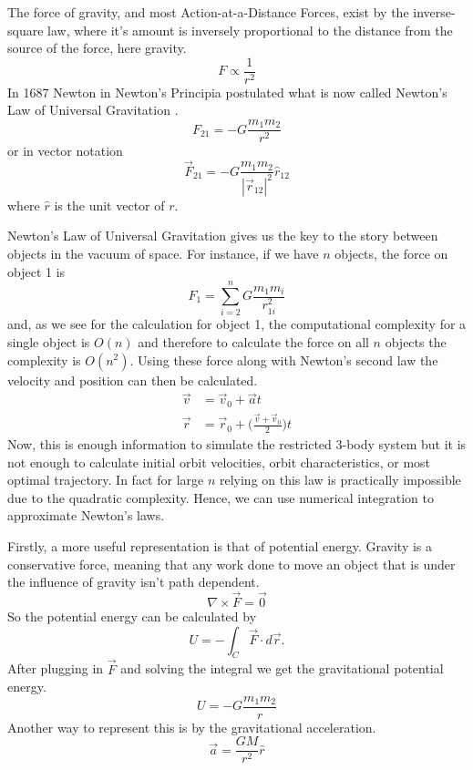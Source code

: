 \documentclass{article}
\begin{document}
The force of gravity, and most Action-at-a-Distance Forces, exist by the inverse-square law, where it's amount is inversely proportional to the distance from the source of the force, here gravity. $$F\propto \frac{1}{r^2}$$ In 1687 Newton in Newton's Principia postulated what is now called Newton's Law of Universal Gravitation \cite{rohrlich_1999}. $$F_{21}=-G\frac{m_1m_2}{r^2}$$ or in vector notation 
\begin{equation}
\vec{F}_{21}=-G\frac{m_1m_2}{|\vec{r}_{12}|^2}\hat{r}_{12}
\end{equation}
 where $\hat{r}$ is the unit vector of $r$.

Newton's Law of Universal Gravitation gives us the key to the story between objects in the vacuum of space. For instance, if we have $n$ objects, the force on object 1 is $$F_1=\sum_{i=2}^n{G\frac{m_1 m_i}{r_{1i}^2}}$$ and, as we see for the calculation for object 1, the computational complexity for a single object is $O(n)$ and therefore to calculate the force on all $n$ objects the complexity is $O(n^2)$. Using these force along with Newton's second law the velocity and position can then be calculated.
\begin{align}
	\vec{v} &= \vec{v}_0+\vec{a}t\\
	\vec{r} &= \vec{r}_0+\bigg(\frac{\vec{v}+\vec{v}_0}{2}\bigg)t
\end{align}
Now, this is enough information to simulate the restricted 3-body system but it is not enough to calculate initial orbit velocities, orbit characteristics, or most optimal trajectory. In fact for large $n$ relying on this law is practically impossible due to the quadratic complexity. Hence, we can use numerical integration to approximate Newton's laws.

Firstly, a more useful representation is that of potential energy. Gravity is a conservative force, meaning that any work done to move an object that is under the influence of gravity isn't path dependent. $$\nabla\times \vec{F}=\vec{0}$$ 
So the potential energy can be calculated by $$U=-\int_C \vec{F}\cdot d\vec{r}.$$ After plugging in $\vec{F}$ and solving the integral we get the gravitational potential energy.
\begin{equation} \label{eq:gravpotential}
U=-G\frac{m_1m_2}{r}
\end{equation}
Another way to represent this is by the gravitational acceleration. 
\begin{equation}
\vec{a}=\frac{GM}{r^2}\hat{r}
\end{equation}
\end{document}
